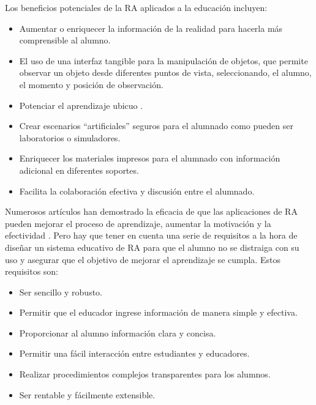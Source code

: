 Los beneficios potenciales de la RA aplicados a la educación incluyen:
\begin{itemize}

    \item Aumentar o enriquecer la información de la realidad para hacerla más comprensible al alumno.
    

    \item El uso de una interfaz tangible para la manipulación de objetos, que permite observar un objeto desde diferentes puntos de vista,
    seleccionando, el alumno, el momento y posición de observación.

    \item Potenciar el aprendizaje ubicuo \cite{URL::AprendizajeUbicuo}.
    
    \item Crear escenarios “artificiales” seguros para el alumnado
    como pueden ser laboratorios o simuladores. 

    \item Enriquecer los materiales impresos para el alumnado con información adicional en diferentes soportes.
    
    \item Facilita la colaboración efectiva y discusión entre el alumnado.
    
\end{itemize}

Numerosos artículos han demostrado la eficacia de que las aplicaciones de RA pueden mejorar el proceso de aprendizaje, aumentar la motivación y la efectividad \cite{URL::animationeco} \cite{URL::ar2}. Pero hay que tener en cuenta una serie de requisitos a la hora de diseñar un sistema educativo de RA para que el alumno no se distraiga con su uso y asegurar que el objetivo de mejorar el aprendizaje se cumpla. Estos requisitos son:

\begin{itemize}
    \item Ser sencillo y robusto.
    \item Permitir que el educador ingrese información de manera simple y efectiva.
    \item Proporcionar al alumno información clara y concisa.
    \item Permitir una fácil interacción entre estudiantes y educadores.
    \item Realizar procedimientos complejos transparentes para los alumnos.
    \item Ser rentable y fácilmente extensible.
\end{itemize}

